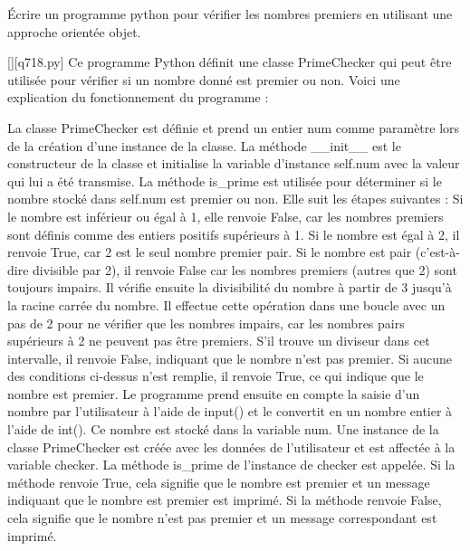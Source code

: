         \question
        Écrire un programme python pour vérifier les nombres premiers en utilisant une approche orientée objet.
        \par
        \begin{solution}
            \renewcommand{\nomfichier}{q718.py}
            \pythonfile{\chemincode \nomfichier}[][\nomfichier]
            Ce programme Python définit une classe PrimeChecker qui peut être utilisée pour vérifier si un nombre donné est premier ou non. Voici une explication du fonctionnement du programme :

    La classe PrimeChecker est définie et prend un entier num comme paramètre lors de la création d'une instance de la classe.
    La méthode \_\_init\_\_ est le constructeur de la classe et initialise la variable d'instance self.num avec la valeur qui lui a été transmise.
    La méthode is\_prime est utilisée pour déterminer si le nombre stocké dans self.num est premier ou non. Elle suit les étapes suivantes :
        Si le nombre est inférieur ou égal à 1, elle renvoie False, car les nombres premiers sont définis comme des entiers positifs supérieurs à 1.
        Si le nombre est égal à 2, il renvoie True, car 2 est le seul nombre premier pair.
        Si le nombre est pair (c'est-à-dire divisible par 2), il renvoie False car les nombres premiers (autres que 2) sont toujours impairs.
        Il vérifie ensuite la divisibilité du nombre à partir de 3 jusqu'à la racine carrée du nombre. Il effectue cette opération dans une boucle avec un pas de 2 pour ne vérifier que les nombres impairs, car les nombres pairs supérieurs à 2 ne peuvent pas être premiers. S'il trouve un diviseur dans cet intervalle, il renvoie False, indiquant que le nombre n'est pas premier.
        Si aucune des conditions ci-dessus n'est remplie, il renvoie True, ce qui indique que le nombre est premier.
    Le programme prend ensuite en compte la saisie d'un nombre par l'utilisateur à l'aide de input() et le convertit en un nombre entier à l'aide de int(). Ce nombre est stocké dans la variable num.
    Une instance de la classe PrimeChecker est créée avec les données de l'utilisateur et est affectée à la variable checker.
    La méthode is\_prime de l'instance de checker est appelée. Si la méthode renvoie True, cela signifie que le nombre est premier et un message indiquant que le nombre est premier est imprimé. Si la méthode renvoie False, cela signifie que le nombre n'est pas premier et un message correspondant est imprimé.
        \end{solution}
        

